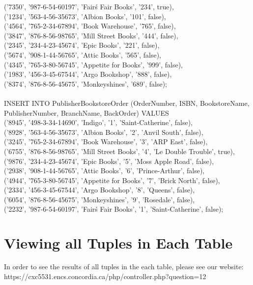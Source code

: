 \documentclass{scrreprt}
\begin{document}
       ('7350', '987-6-54-60197', 'Fair\'s Fair Books', '234', true),\\
       ('1234', '563-4-56-35673', 'Albion Books', '101', false),\\
       ('4564', '765-2-34-67894', 'Book Warehouse', '765', false),\\
       ('3847', '876-8-56-98765', 'Mill Street Books', '444', false),\\
       ('2345', '234-4-23-45674', 'Epic Books', '221', false),\\
       ('5674', '908-1-44-56765', 'Attic Books', '565', false),\\
       ('4345', '765-3-80-56745', 'Appetite for Books', '999', false),\\
       ('1983', '456-3-45-67544', 'Argo Bookshop', '888', false),\\
       ('8374', '876-8-56-45675', 'Monkeyshines', '689', false);\\\\
INSERT INTO PublisherBookstoreOrder (OrderNumber, ISBN, BookstoreName, PublisherNumber, BranchName, BackOrder)
VALUES\\ ('8945', '498-3-34-14690', 'Indigo', '1', 'Saint-Catherine', false),\\
       ('8928', '563-4-56-35673', 'Albion Books', '2', 'Anvil South', false),\\
       ('3245', '765-2-34-67894', 'Book Warehouse', '3', 'ARP East', false),\\
       ('6755', '876-8-56-98765', 'Mill Street Books', '4', 'Le Double Trouble', true),\\
       ('9876', '234-4-23-45674', 'Epic Books', '5', 'Moss Apple Road', false),\\
       ('2938', '908-1-44-56765', 'Attic Books', '6', 'Prince-Arthur', false),\\
       ('4944', '765-3-80-56745', 'Appetite for Books', '7', 'Brick North', false),\\
       ('2334', '456-3-45-67544', 'Argo Bookshop', '8', 'Queens', false),\\
       ('6054', '876-8-56-45675', 'Monkeyshines', '9', 'Rosedale', false),\\
       ('2232', '987-6-54-60197', 'Fair\'s Fair Books', '1', 'Saint-Catherine', false);\\

\chapter{Viewing all Tuples in Each Table}

In order to see the results of all tuples in the each table, please see our website: https://cxc5531.encs.concordia.ca/php/controller.php?question=12
\end{document}
